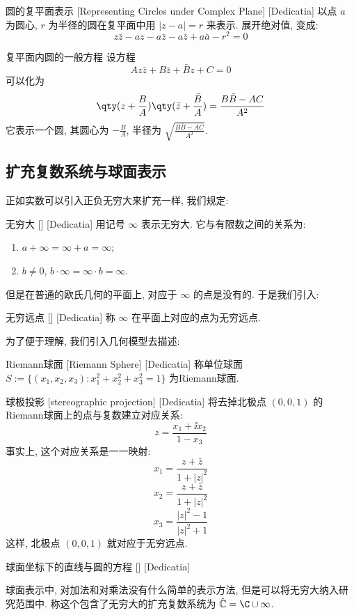 \documentclass[UTF8]{ctexart}
\begin{document}
\begin{dfn}
    [CircleComplexRepresenting]
    {圆的复平面表示}
    [Representing Circles under Complex Plane]
    [Dedicatia]
    以点 \( a \) 为圆心,  \( r \) 为半径的圆在复平面中用 \( |z-a|=r \) 来表示. 展开绝对值, 变成: 
    \[z\bar{z}-az-a\bar{z}-a\bar{z}+a\bar{a}-r^2=0\]
\end{dfn}
\begin{dfn}
    {复平面内圆的一般方程}
    设方程
    \[Az\bar{z}+B\bar{z}+\bar{B}z+C=0\]
    可以化为
    \[\qty(z+\frac{B}{A})\qty(\bar{z}+\frac{\bar{B}}{A})=\frac{B\bar{B}-AC}{A^2}\]
    它表示一个圆, 其圆心为 \( -\frac{B}{A} \), 半径为 \( \sqrt{\frac{B\bar{B}-AC}{A^2}} \).
\end{dfn}
\subsection{扩充复数系统与球面表示}
正如实数可以引入正负无穷大来扩充一样, 我们规定: 
\begin{dfn}
    [UUID]
    {无穷大}
    []
    [Dedicatia]
    用记号 \( \infty \) 表示无穷大. 它与有限数之间的关系为:
    \begin{enumerate}
        \item  \( a+\infty=\infty+a=\infty \);
        \item  \( b\neq 0 \),  \( b\cdot\infty=\infty\cdot b=\infty \).
    \end{enumerate}
\end{dfn}
但是在普通的欧氏几何的平面上, 对应于 \( \infty \) 的点是没有的. 于是我们引入: 
\begin{dfn}
    [UUID]
    {无穷远点}
    []
    [Dedicatia]
    称 \( \infty \) 在平面上对应的点为无穷远点. 
\end{dfn}
为了便于理解, 我们引入几何模型去描述: 
\begin{dfn}
    [UUID]
    {Riemann球面}
    [Riemann Sphere]
    [Dedicatia]
    称单位球面 \( S:=\{(x_1,x_2,x_3):x_1^2+x_2^2+x_3^2=1\} \) 为Riemann球面. 
\end{dfn}
\begin{ppt}
    [UUID]
    {球极投影}
    [stereographic projection]
    [Dedicatia]
    将去掉北极点 \( (0,0,1) \) 的Riemann球面上的点与复数建立对应关系: 
    \[z=\frac{x_1+\ii x_2}{1-x_3}\]
    事实上, 这个对应关系是一一映射: 
    \[x_1=\frac{z+\bar{z}}{1+|z|^2}\]
    \[x_2=\frac{z+\bar{z}}{1+|z|^2}\]
    \[x_3=\frac{|z|^2-1}{|z|^2+1}\]
    这样, 北极点 \( (0,0,1) \) 就对应于无穷远点. 
\end{ppt}
\begin{ppt}
    [UUID]
    {球面坐标下的直线与圆的方程}
    []
    [Dedicatia]
\end{ppt}
球面表示中, 对加法和对乘法没有什么简单的表示方法, 但是可以将无穷大纳入研究范围中. 称这个包含了无穷大的扩充复数系统为 \( \hat{\mathbb{C}}=\C\cup\infty  \).
\end{document}
